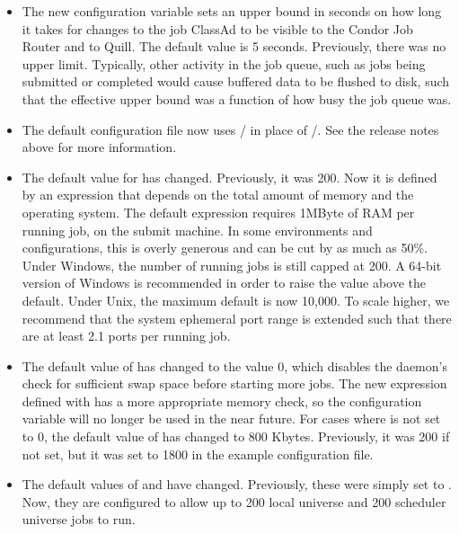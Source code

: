 \begin{itemize}

\item The new configuration variable 
   sets an
  upper bound in seconds on how long it takes for changes to the job
  ClassAd to be visible to the Condor Job Router and to Quill.
  The default value is 5 seconds.
  Previously, there was no upper limit.  Typically, other activity in
  the job queue, such as jobs being submitted or completed would cause
  buffered data to be flushed to disk, such that the effective upper bound was
  a function of how busy the job queue was.

\item The default configuration file now uses
  / in place of
  /.  See the release notes above
  for more information.

\item The default value for  has changed.
  Previously, it was 200.  Now it is defined by an expression that depends 
  on the total amount of memory and the operating system.  The default
  expression requires 1MByte of RAM per running job, on the submit machine.
  In some environments and configurations, this is overly
  generous and can be cut by as much as 50\%.  Under Windows, the
  number of running jobs is still capped at 200.
  A 64-bit version of Windows  is recommended in order to raise the value
  above the default.
  Under Unix, the maximum default is now 10,000.  To scale higher, we
  recommend that the system ephemeral port range is extended
  such that there are at least 2.1 ports per running job.

\item The default value of  has changed to
  the value 0, which
  disables the  daemon's check for sufficient swap space
  before starting more jobs.  The new expression defined with 
   has a more appropriate memory check, so
  the configuration variable  will no longer
  be used in the near future.
  For cases where 
   is not set to 0, the default value
  of  has changed to 800 Kbytes.
  Previously, it was 200 if not set,
  but it was set to 1800 in the example configuration file.

\item The default values of  and
   have changed.  Previously,
  these were simply set to .  Now, they are configured to allow
  up to 200 local universe and 200 scheduler universe jobs to run.


\end{itemize}
